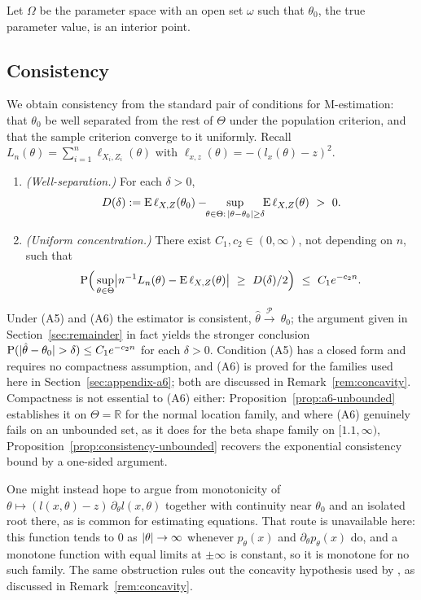 Let $\Omega$ be the parameter space with an open set $\omega$ such that $\theta_0$, the true parameter value, is an interior point.

\subsection{Consistency}
\label{sec:consistency}

We obtain consistency from the standard pair of conditions for M-estimation: that $\theta_{0}$ be well separated from the rest of $\Theta$ under the population criterion, and that the sample criterion converge to it uniformly. Recall $L_n(\theta)=\sum_{i=1}^{n}\ell_{X_i,Z_i}(\theta)$ with $\ell_{x,z}(\theta)=-(l_x(\theta)-z)^2$.

\begin{enumerate}
	\item[(A5)] \emph{(Well-separation.)} For each $\delta>0$,
	$$
	D(\delta) := \E\,\ell_{X,Z}(\theta_0)-\!\!\sup_{\theta\in\Theta:\,\abs{\theta-\theta_0}\ge\delta}\!\!\E\,\ell_{X,Z}(\theta)\ >\ 0 .
	$$
	\item[(A6)] \emph{(Uniform concentration.)} There exist $C_1,c_2\in(0,\infty)$, not depending on $n$, such that
	$$
	\Prob\Big(\sup_{\theta\in\Theta}\abs*{n^{-1}L_n(\theta)-\E\,\ell_{X,Z}(\theta)}\ \ge\ D(\delta)/2\Big)\ \le\ C_1 e^{-c_2 n}.
	$$
\end{enumerate}

Under (A5) and (A6) the estimator is consistent, $\hat{\theta} \xrightarrow{\mathcal{P}}\ \theta_0$; the argument given in Section~\ref{sec:remainder} in fact yields the stronger conclusion $\mathrm{P}(\lvert\hat\theta-\theta_0\rvert>\delta)\le C_1e^{-c_2 n}$ for each $\delta>0$. Condition (A5) has a closed form and requires no compactness assumption, and (A6) is proved for the families used here in Section~\ref{sec:appendix-a6}; both are discussed in Remark~\ref{rem:concavity}. Compactness is not essential to (A6) either: Proposition~\ref{prop:a6-unbounded} establishes it on $\Theta=\mathbb{R}$ for the normal location family, and where (A6) genuinely fails on an unbounded set, as it does for the beta shape family on $[1.1,\infty)$, Proposition~\ref{prop:consistency-unbounded} recovers the exponential consistency bound by a one-sided argument.

One might instead hope to argue from monotonicity of $\theta\mapsto(l(x,\theta)-z)\,\partial_{\theta}l(x,\theta)$ together with continuity near $\theta_0$ and an isolated root there, as is common for estimating equations. That route is unavailable here: this function tends to $0$ as $\lvert\theta\rvert\to\infty$ whenever $p_{\theta}(x)$ and $\partial_{\theta}p_{\theta}(x)$ do, and a monotone function with equal limits at $\pm\infty$ is constant, so it is monotone for no such family. The same obstruction rules out the concavity hypothesis used by \cite{Pinelis2017}, as discussed in Remark~\ref{rem:concavity}.

